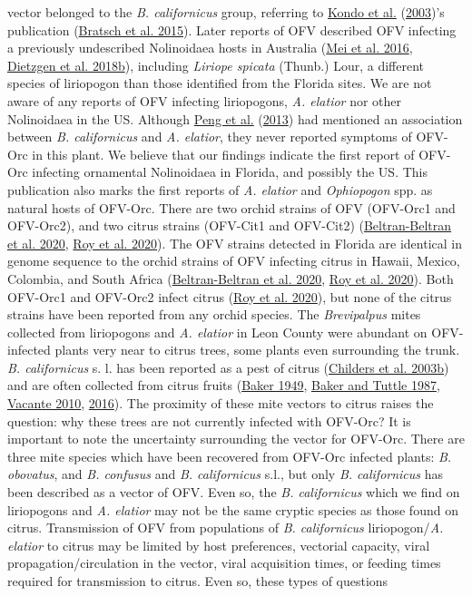 \documentclass[12pt,final,CPage]{ufthesis}
\begin{document}
{vector belonged to the \emph{B. californicus} group, referring to \protect\hyperlink{ref-Kondo2003}{Kondo et al.} (\protect\hyperlink{ref-Kondo2003}{2003})'s publication (\protect\hyperlink{ref-Bratsch2015}{Bratsch et al. 2015}). Later reports of OFV described OFV infecting a previously undescribed Nolinoidaea hosts in Australia (\protect\hyperlink{ref-Mei2016}{Mei et al. 2016}, \protect\hyperlink{ref-Dietzgen2018a}{Dietzgen et al. 2018b}), including \emph{Liriope spicata} (Thunb.) Lour, a different species of liriopogon than those identified from the Florida sites. We are not aware of any reports of OFV infecting liriopogons, \emph{A. elatior} nor other Nolinoidaea in the US. Although \protect\hyperlink{ref-Peng2013}{Peng et al.} (\protect\hyperlink{ref-Peng2013}{2013}) had mentioned an association between \emph{B. californicus} and \emph{A. elatior}, they never reported symptoms of OFV-Orc in this plant. We believe that our findings indicate the first report of OFV-Orc infecting ornamental Nolinoidaea in Florida, and possibly the US. This publication also marks the first reports of \emph{A. elatior} and \emph{Ophiopogon} spp. as natural hosts of OFV-Orc. There are two orchid strains of OFV (OFV-Orc1 and OFV-Orc2), and two citrus strains (OFV-Cit1 and OFV-Cit2) (\protect\hyperlink{ref-Beltran-Beltran2020}{Beltran-Beltran et al. 2020}, \protect\hyperlink{ref-Roy2020}{Roy et al. 2020}). The OFV strains detected in Florida are identical in genome sequence to the orchid strains of OFV infecting citrus in Hawaii, Mexico, Colombia, and South Africa (\protect\hyperlink{ref-Beltran-Beltran2020}{Beltran-Beltran et al. 2020}, \protect\hyperlink{ref-Roy2020}{Roy et al. 2020}). Both OFV-Orc1 and OFV-Orc2 infect citrus (\protect\hyperlink{ref-Roy2020}{Roy et al. 2020}), but none of the citrus strains have been reported from any orchid species. The \emph{Brevipalpus} mites collected from liriopogons and \emph{A. elatior} in Leon County were abundant on OFV-infected plants very near to citrus trees, some plants even surrounding the trunk. \emph{B. californicus} s. l. has been reported as a pest of citrus (\protect\hyperlink{ref-Childers2003}{Childers et al. 2003b}) and are often collected from citrus fruits (\protect\hyperlink{ref-Baker1949}{Baker 1949}, \protect\hyperlink{ref-Baker1987}{Baker and Tuttle 1987}, \protect\hyperlink{ref-Vacante2010}{Vacante 2010}, \protect\hyperlink{ref-Vacante2016}{2016}). The proximity of these mite vectors to citrus raises the question: why these trees are not currently infected with OFV-Orc? It is important to note the uncertainty surrounding the vector for OFV-Orc. There are three mite species which have been recovered from OFV-Orc infected plants: \emph{B. obovatus}, and \emph{B. confusus} and \emph{B. californicus} s.l., but only \emph{B. californicus} has been described as a vector of OFV. Even so, the \emph{B. californicus} which we find on liriopogons and \emph{A. elatior} may not be the same cryptic species as those found on citrus. Transmission of OFV from populations of \emph{B. californicus} liriopogon/\emph{A. elatior} to citrus may be limited by host preferences, vectorial capacity, viral propagation/circulation in the vector, viral acquisition times, or feeding times required for transmission to citrus. Even so, these types of questions }
\end{document}
